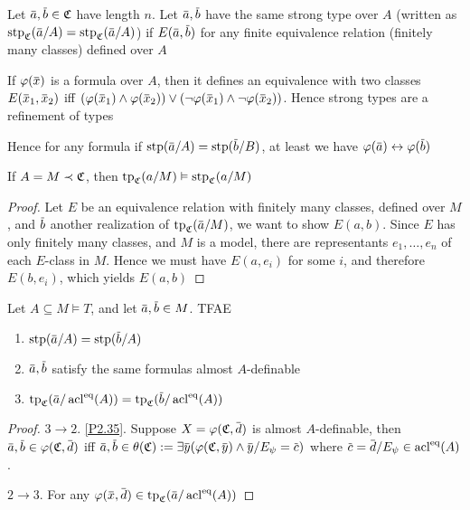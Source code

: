 \documentclass[11pt]{article}
\begin{document}
\begin{definition}[]
Let \(\bara,\barb\in\fC\) have length \(n\). Let \(\bara,\barb\) have the same strong type
over \(A\) (written as \(\stp_{\fC}(\bara/A)=\stp_{\fC}(\bara/A)\)) if \(E(\bara,\barb)\) for any
finite equivalence relation (finitely many classes) defined over \(A\)
\end{definition}

\begin{remark}
If \(\varphi(\barx)\) is a formula over \(A\), then it defines an equivalence with two
classes \(E(\barx_1,\barx_2)\) iff \((\varphi(\barx_1)\wedge\varphi(\barx_2))\vee(\neg\varphi(\barx_1)\wedge\neg\varphi(\barx_2))\). Hence strong
types are a refinement of types

Hence for any formula if \(\stp(\bara/A)=\stp(\barb/B)\), at least we have \(\varphi(\bara)\leftrightarrow\varphi(\barb)\)
\end{remark}

\begin{lemma}[]
If \(A=M\prec\mathfrak{C}\), then \(\operatorname{tp}_{\mathfrak{C}}(a/M)\vDash\operatorname{stp}_{\mathfrak{C}}(a/M)\)
\end{lemma}

\begin{proof}
Let \(E\) be an equivalence relation with finitely many classes, defined over \(M\),
and \(\barb\) another realization of \(\tp_{\fC}(\bara/M)\), we want to show \(E(a,b)\).
Since \(E\) has only finitely many classes, and \(M\) is a model, there are
representants \(e_1,\dots,e_n\) of each \(E\)-class in \(M\). Hence we must have \(E(a,e_i)\) for
some \(i\), and therefore \(E(b,e_i)\), which yields \(E(a,b)\)
\end{proof}

\begin{lemma}[]
Let \(A\subseteq M\vDash T\), and let \(\bara,\barb\in M\). TFAE
\begin{enumerate}
\item \(\stp(\bara/A)=\stp(\barb/A)\)
\item \(\bara,\barb\) satisfy the same formulas almost \(A\)-definable
\item \(\tp_{\fC}(\bara/\acl^{\eq}(A))=\tp_{\fC}(\barb/\acl^{\eq}(A))\)
\end{enumerate}
\end{lemma}

\begin{proof}
\(3\to 2\). \ref{P2.35}. Suppose \(X=\varphi(\fC,\bard)\) is almost \(A\)-definable,
then \(\bara,\barb\in\varphi(\fC,\bard)\) iff \(\bara,\barb\in\theta(\fC):=\exists\bary(\varphi(\fC,\bary)\wedge\bary/E_\psi=\barc)\)
where \(\barc=\bard/E_\psi\in\acl^{\eq}(A)\).

\(2\to 3\). For any \(\varphi(\barx,\bard)\in\tp_{\fC}(\bara/\acl^{\eq}(A))\)
\end{proof}
\end{document}
